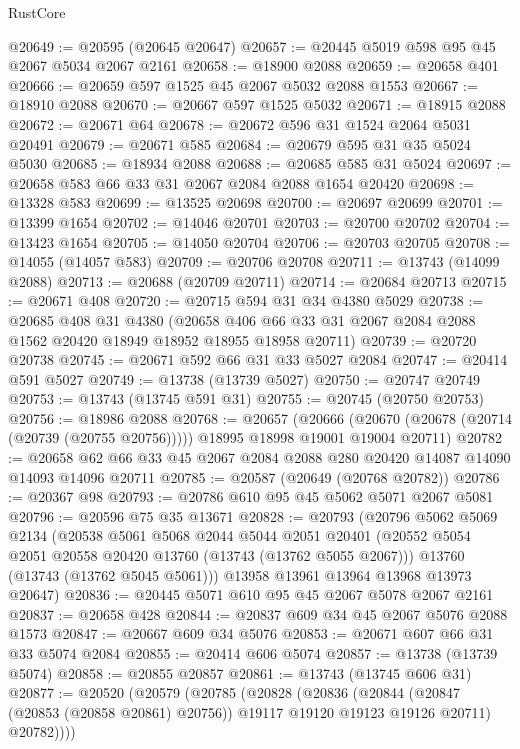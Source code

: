 \begin{lexlean}{RustCore}
\begin{coremodule}
@20649 := @20595 (@20645 @20647)
@20657 := @20445 @5019 @598 @95 @45 @2067 @5034 @2067 @2161
@20658 := @18900 @2088
@20659 := @20658 @401
@20666 := @20659 @597 @1525 @45 @2067 @5032 @2088 @1553
@20667 := @18910 @2088
@20670 := @20667 @597 @1525 @5032
@20671 := @18915 @2088
@20672 := @20671 @64
@20678 := @20672 @596 @31 @1524 @2064 @5031 @20491
@20679 := @20671 @585
@20684 := @20679 @595 @31 @35 @5024 @5030
@20685 := @18934 @2088
@20688 := @20685 @585 @31 @5024
@20697 := @20658 @583 @66 @33 @31 @2067 @2084 @2088 @1654 @20420
@20698 := @13328 @583
@20699 := @13525 @20698
@20700 := @20697 @20699
@20701 := @13399 @1654
@20702 := @14046 @20701
@20703 := @20700 @20702
@20704 := @13423 @1654
@20705 := @14050 @20704
@20706 := @20703 @20705
@20708 := @14055 (@14057 @583)
@20709 := @20706 @20708
@20711 := @13743 (@14099 @2088)
@20713 := @20688 (@20709 @20711)
@20714 := @20684 @20713
@20715 := @20671 @408
@20720 := @20715 @594 @31 @34 @4380 @5029
@20738 := @20685
    @408
    @31
    @4380
    (@20658 @406 @66 @33 @31 @2067 @2084 @2088 @1562 @20420 @18949 @18952 @18955 @18958 @20711)
@20739 := @20720 @20738
@20745 := @20671 @592 @66 @31 @33 @5027 @2084
@20747 := @20414 @591 @5027
@20749 := @13738 (@13739 @5027)
@20750 := @20747 @20749
@20753 := @13743 (@13745 @591 @31)
@20755 := @20745 (@20750 @20753)
@20756 := @18986 @2088
@20768 := @20657
    (@20666 (@20670 (@20678 (@20714 (@20739 (@20755 @20756))))) @18995 @18998 @19001 @19004 @20711)
@20782 := @20658 @62 @66 @33 @45 @2067 @2084 @2088 @280 @20420 @14087 @14090 @14093 @14096 @20711
@20785 := @20587 (@20649 (@20768 @20782))
@20786 := @20367 @98
@20793 := @20786 @610 @95 @45 @5062 @5071 @2067 @5081
@20796 := @20596 @75 @35 @13671
@20828 := @20793
    (@20796
      @5062
      @5069
      @2134
      (@20538
        @5061
        @5068
        @2044
        @5044
        @2051
        @20401
        (@20552 @5054 @2051 @20558 @20420 @13760 (@13743 (@13762 @5055 @2067)))
        @13760
        (@13743 (@13762 @5045 @5061)))
      @13958
      @13961
      @13964
      @13968
      @13973
      @20647)
@20836 := @20445 @5071 @610 @95 @45 @2067 @5078 @2067 @2161
@20837 := @20658 @428
@20844 := @20837 @609 @34 @45 @2067 @5076 @2088 @1573
@20847 := @20667 @609 @34 @5076
@20853 := @20671 @607 @66 @31 @33 @5074 @2084
@20855 := @20414 @606 @5074
@20857 := @13738 (@13739 @5074)
@20858 := @20855 @20857
@20861 := @13743 (@13745 @606 @31)
@20877 := @20520
    (@20579
      (@20785
        (@20828
          (@20836
            (@20844 (@20847 (@20853 (@20858 @20861) @20756)) @19117 @19120 @19123 @19126 @20711)
            @20782))))

\end{coremodule}
\end{lexlean}
